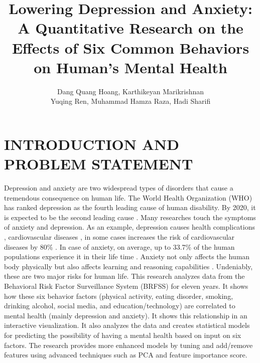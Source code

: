 \documentclass[letterpaper, 10 pt, conference]{ieeeconf}  %
\title{\LARGE \bf
Lowering Depression and Anxiety: A Quantitative Research on the Effects of Six Common Behaviors 
on Human's Mental Health
}
\author{Dang Quang Hoang, Karthikeyan Marikrishnan \\ Yuqing Ren, Muhammad Hamza Raza, Hadi Sharifi}
\begin{document}
\maketitle
\thispagestyle{empty}
\pagestyle{empty}






\section{INTRODUCTION AND PROBLEM STATEMENT}
Depression and anxiety are two widespread types of disorders that cause a tremendous consequence on human life.  
The World Health Organization (WHO) has ranked depression as the fourth leading cause of human disability.
By 2020, it is expected to be the second leading cause \cite{kessler2013epidemiology}. Many researches touch the symptoms of anxiety and depression.
As an example, depression causes health 
complications \cite{verma2017impact}, cardiovascular diseases \cite{bradley2015depression}, in some cases increases 
the risk of cardiovascular diseases by 80\% \cite{penninx2017depression}. In case of anxiety, on average, up to 33.7\% of 
the human populations experience it in their life time \cite{bandelow2015epidemiology}. Anxiety not only affects the human body physically
but also affects learning and reasoning capabilities \cite{spielberger2013effects}\cite{darke1988effects}. 
Undeniably, these are two major risks for human life.
This research analyzes data from the Behavioral Risk Factor Surveillance System (BRFSS)\cite{brfss} for eleven years. 
It shows how these six behavior factors (physical activity, eating disorder, 
smoking, drinking alcohol, social media, and education/technology) are correlated to mental health (mainly depression and anxiety). It shows
this relationship in an interactive visualization. It also analyzes the data and creates statistical models for predicting the possibility of 
having a mental health based on input on six factors. The research provides more enhanced models by tuning and add/remove features using
advanced techniques such as PCA and feature importance score. 
 
\end{document}

